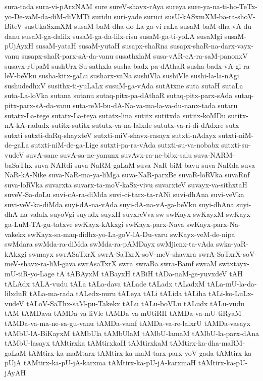 {sura-tada
sura-vi-pArxNAM
sure
sureV-shavx-rAya
sureya
sure-ya-na-ti-ho-TeTx-yo-De-vaM-da-diM-diVMTi
suridu
suri-yade
suruci
susU-kASxmXM-ba-ra-shoV-BiteV
susUkaSxmXM
susaM-baM-dha-do-La-ga-vi-raLa
susaM-baM-dha-vA-du-danu
susaM-ga-dalilx
susaM-ga-da-lilx-risu
susaM-ga-ti-yoLA
susaMgi
susaM-pUjAyxH
susaM-yataH
susaM-yutaH
susapx-shaRna
susapx-shaR-na-darx-vayx-vanu
susapx-shaR-parx-sA-da-vanu
susathxlaM
susa-vAR-cA-ra-saM-panonxV
susavx-rUpaM
sushUrx-Su-sathxla
susha-badx-pa-dAthaR
susha-badx-vA-gi-ra-leV-beVku
susha-kitx-gaLu
susharx-vaNa
sushiVla
sushiVle
sushi-la-la-nAgi
sushudedhxV
susithx-ti-yuLaLx
susuM-ga-vAda
sutAtxne
suta
sutaH
sutaLa
suta-La-loVka
sutana
sutanu
sutaq-pitx-pa-dAthaR
sutaq-pitx-parx-sAda
sutaq-pitx-parx-sA-da-vanu
suta-reM-bu-dA-Na-va-ma-la-va-du-nanx-tada
sutaru
sutatx-La-tege
sutatx-La-teya
sutatx-lina
sutitx
sutitxda
sutitx-koMDu
sutitx-nA-kA-radudx
sutitx-sutitx
sututx-va-na-lalxde
sututx-va-ri-di-dAdxre
sutx
sutxti
sutxti-daRq-shayxteV
sutxti-miV-shavx-rasayx
sutxti-nAdayx
sutxti-niM-de-gaLa
sutxti-niM-de-ga-Lige
sutxti-pa-ra-vAda
sutxti-su-va-nobabx
sutxti-su-vudeV
suvA-sane
suvA-sa-ne-yanunx
suvAvx-ra-ne-bibx-salu
suva-NARM-baSaThx
suva-NARdi
suva-NaRM-gaLaM
suva-NaR-biM-bavu
suva-NaRda
suva-NaR-kA-Nike
suva-NaR-ma-ya-liMga
suva-NaR-parxBe
suvaR-loRVka
suvaRnf
suva-loRVka
suvarxta
suvarx-ta-moV-kaSx-vivu
suvarxteV
suvayx-va-sithxtaH
suveV-Sa-doLu
suvi-cA-ra-diMda
suvi-ci-tarx-ta-rANi
suvi-dhAna
suvi-veVka
suvi-veV-ka-diMda
suyi-dA-na-vAda
suyi-dA-na-vA-ga-beVku
suyi-dhAna
suyi-dhA-na-valalx
suyoVgi
suyudx
suyxH
suyxreVva
sw
swKayx
swKayxM
swKayx-ga-LuM-TA-gu-tatxve
swKayx-kAkxgi
swKayx-parx-Nava
swKayx-parx-Na-vakekx
swKayx-sa-maq-didhx-yo-La-goV-lA-Du-varu
swKayx-veM-de-nipa
swMdara
swMda-ra-diMda
swMda-ra-pAMDayx
swMjicnx-ta-vAda
swka-yaR-kAkxgi
swmayx
swrASaTxrX
swrA-SaTxrX-soV-meV-shavxra
swrA-SaTxrX-soV-meV-shavx-ra-liM-gava
swrAsaTxrX
swra
swraBa
swra-Bamf
swraM
swtxtayx-mU-tiR-yo-Lage
tA
tABAyxM
tABayxH
tABiH
tADa-naM-ge-yuvxdeV
tAH
tALAdx
tALA-vudu
tALa
tALa-dava
tALade
tALadx
tALadxM
tALa-mU-la-da-lilxduR
tALa-ma-rada
tALedx-nuru
tALeya
tALi
tALida
tALiha
tALi-ko-LuLx-vudeV
tALoV-SaThx-saM-pu-Takekx
tALu
tALu-boVLu
tALudx
tALu-vudu
tAM
tAMDava
tAMDa-va-liVle
tAMDa-va-mUtiRH
tAMDa-va-mU-tiRyaM
tAMDa-va-ma-ne-sa-gu-vanu
tAMDa-vamf
tAMDa-va-re-lalxrU
tAMDa-vasayx
tAMbU-lA-BiKayxM
tAMbUla
tAMbUlaM
tAMbU-lamaM
tAMbU-la-parx-dAna
tAMbU-lasayx
tAMtirxka
tAMtirxkaH
tAMtirxkaM
tAMtirx-ka-dha-maRM-gaLaM
tAMtirx-ka-maMtarx
tAMtirx-ka-maM-tarx-parx-yoV-gada
tAMtirx-ka-pUjA
tAMtirx-ka-pU-jA-karxma
tAMtirx-ka-pU-jA-karxmaH
tAMtirx-ka-pU-jAyAH
}

